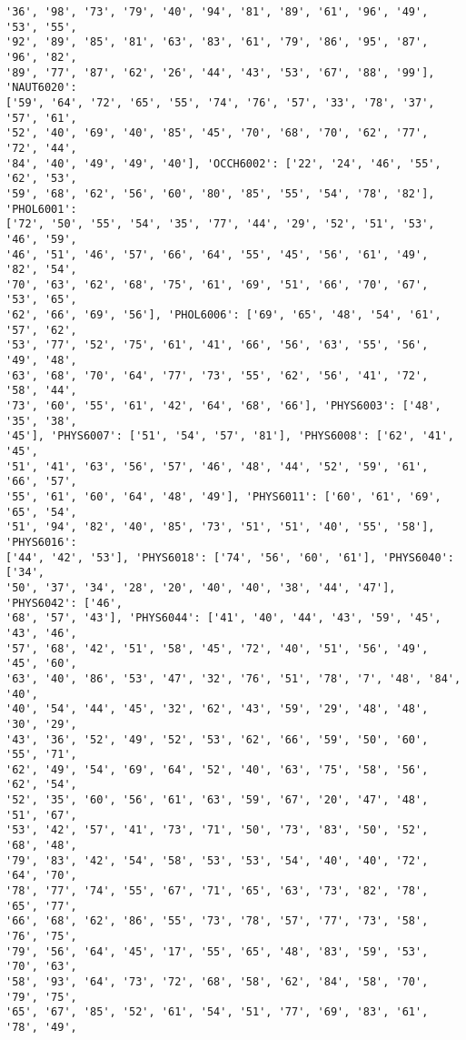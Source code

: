 \documentclass[11pt]{article}
\begin{document}
\begin{Verbatim}[commandchars=\\\{\}]
'36', '98', '73', '79', '40', '94', '81', '89', '61', '96', '49', '53', '55',
'92', '89', '85', '81', '63', '83', '61', '79', '86', '95', '87', '96', '82',
'89', '77', '87', '62', '26', '44', '43', '53', '67', '88', '99'], 'NAUT6020':
['59', '64', '72', '65', '55', '74', '76', '57', '33', '78', '37', '57', '61',
'52', '40', '69', '40', '85', '45', '70', '68', '70', '62', '77', '72', '44',
'84', '40', '49', '49', '40'], 'OCCH6002': ['22', '24', '46', '55', '62', '53',
'59', '68', '62', '56', '60', '80', '85', '55', '54', '78', '82'], 'PHOL6001':
['72', '50', '55', '54', '35', '77', '44', '29', '52', '51', '53', '46', '59',
'46', '51', '46', '57', '66', '64', '55', '45', '56', '61', '49', '82', '54',
'70', '63', '62', '68', '75', '61', '69', '51', '66', '70', '67', '53', '65',
'62', '66', '69', '56'], 'PHOL6006': ['69', '65', '48', '54', '61', '57', '62',
'53', '77', '52', '75', '61', '41', '66', '56', '63', '55', '56', '49', '48',
'63', '68', '70', '64', '77', '73', '55', '62', '56', '41', '72', '58', '44',
'73', '60', '55', '61', '42', '64', '68', '66'], 'PHYS6003': ['48', '35', '38',
'45'], 'PHYS6007': ['51', '54', '57', '81'], 'PHYS6008': ['62', '41', '45',
'51', '41', '63', '56', '57', '46', '48', '44', '52', '59', '61', '66', '57',
'55', '61', '60', '64', '48', '49'], 'PHYS6011': ['60', '61', '69', '65', '54',
'51', '94', '82', '40', '85', '73', '51', '51', '40', '55', '58'], 'PHYS6016':
['44', '42', '53'], 'PHYS6018': ['74', '56', '60', '61'], 'PHYS6040': ['34',
'50', '37', '34', '28', '20', '40', '40', '38', '44', '47'], 'PHYS6042': ['46',
'68', '57', '43'], 'PHYS6044': ['41', '40', '44', '43', '59', '45', '43', '46',
'57', '68', '42', '51', '58', '45', '72', '40', '51', '56', '49', '45', '60',
'63', '40', '86', '53', '47', '32', '76', '51', '78', '7', '48', '84', '40',
'40', '54', '44', '45', '32', '62', '43', '59', '29', '48', '48', '30', '29',
'43', '36', '52', '49', '52', '53', '62', '66', '59', '50', '60', '55', '71',
'62', '49', '54', '69', '64', '52', '40', '63', '75', '58', '56', '62', '54',
'52', '35', '60', '56', '61', '63', '59', '67', '20', '47', '48', '51', '67',
'53', '42', '57', '41', '73', '71', '50', '73', '83', '50', '52', '68', '48',
'79', '83', '42', '54', '58', '53', '53', '54', '40', '40', '72', '64', '70',
'78', '77', '74', '55', '67', '71', '65', '63', '73', '82', '78', '65', '77',
'66', '68', '62', '86', '55', '73', '78', '57', '77', '73', '58', '76', '75',
'79', '56', '64', '45', '17', '55', '65', '48', '83', '59', '53', '70', '63',
'58', '93', '64', '73', '72', '68', '58', '62', '84', '58', '70', '79', '75',
'65', '67', '85', '52', '61', '54', '51', '77', '69', '83', '61', '78', '49',

\end{Verbatim}
\end{document}
